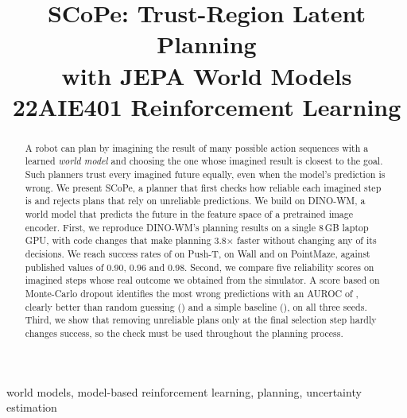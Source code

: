 \documentclass[conference]{IEEEtran}
\begin{document}
\title{SCoPe: Trust-Region Latent Planning\\with JEPA World Models\\[0.3em]{\large 22AIE401 Reinforcement Learning}}

\author{
\and
{}
\and
{}
}

\maketitle
\thispagestyle{plain}
\pagestyle{plain}

\begin{abstract}
A robot can plan by imagining the result of many possible action sequences with a learned \emph{world model} and
choosing the one whose imagined result is closest to the goal. Such planners trust every imagined future equally, even
when the model's prediction is wrong. We present SCoPe, a planner that first checks how reliable each imagined step is
and rejects plans that rely on unreliable predictions. We build on DINO-WM, a world model that predicts the future in
the feature space of a pretrained image encoder. First, we reproduce DINO-WM's planning results on a single 8\,GB laptop
GPU, with code changes that make planning 3.8$\times$ faster without changing any of its decisions. We reach success
rates of \PushTFinalMean{} on Push-T, \WallFinalMean{} on Wall and \MazeFinalMean{} on PointMaze, against published
values of 0.90, 0.96 and 0.98. Second, we compare five reliability scores on \HPairs{} imagined steps whose real outcome
we obtained from the simulator. A score based on Monte-Carlo dropout identifies the most wrong predictions with an
AUROC of \HMC{}, clearly better than random guessing (\HRand{}) and a simple baseline (\HDist{}), on all three seeds.
Third, we show that removing unreliable plans only at the final selection step hardly changes success, so the check
must be used throughout the planning process.
\end{abstract}

\begin{IEEEkeywords}
world models, model-based reinforcement learning, planning, uncertainty estimation
\end{IEEEkeywords}
\end{document}
